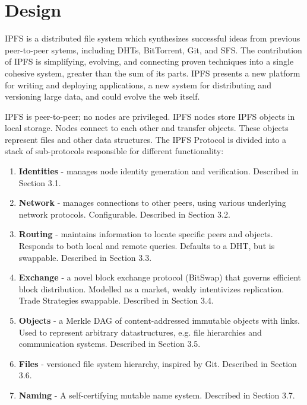 \documentclass{sig-alternate}
\begin{document}
\section{Design}

IPFS is a distributed file system which synthesizes successful ideas from previous peer-to-peer sytems, including DHTs, BitTorrent, Git, and SFS. The contribution of IPFS is simplifying, evolving, and connecting proven techniques into a single cohesive system, greater than the sum of its parts. IPFS presents a new platform for writing and deploying applications, a new system for distributing and versioning large data, and could evolve the web itself.

IPFS is peer-to-peer; no nodes are privileged. IPFS nodes store IPFS objects in local storage. Nodes connect to each other and transfer objects. These objects represent files and other data structures. The IPFS Protocol is divided into a stack of sub-protocols responsible for different functionality:

\begin{enumerate}
  \item \textbf{Identities} - manages node identity generation and verification. Described in Section 3.1.

  \item \textbf{Network} - manages connections to other peers, using various underlying network protocols. Configurable. Described in Section 3.2.

  \item \textbf{Routing} - maintains information to locate specific peers and objects. Responds to both local and remote queries. Defaults to a DHT, but is swappable. Described in Section 3.3.

  \item \textbf{Exchange} - a novel block exchange protocol (BitSwap) that governs efficient block distribution. Modelled as a market, weakly intentivizes replication. Trade Strategies swappable. Described in Section 3.4.

  \item \textbf{Objects} - a Merkle DAG of content-addressed immutable objects with links. Used to represent arbitrary datastructures, e.g. file hierarchies and communication systems. Described in Section 3.5.

  \item \textbf{Files} - versioned file system hierarchy, inspired by Git. Described in Section 3.6.

  \item \textbf{Naming} - A self-certifying mutable name system. Described in Section 3.7.
\end{enumerate}
\end{document}
